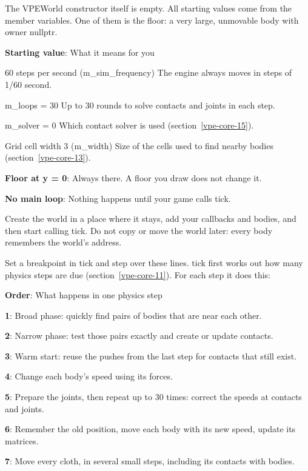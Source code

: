 \documentclass[11pt,a4paper]{article}
\begin{document}
The VPEWorld constructor itself is empty. All starting values come from the member variables. One of them is the floor: a very large, unmovable body with owner nullptr.

\textbf{Starting value}: What it means for you

60 steps per second (m\_sim\_frequency)                        The engine always moves in steps of 1/60 second.

m\_loops = 30                                                 Up to 30 rounds to solve contacts and joints in each step.

m\_solver = 0                                                 Which contact solver is used (section~\ref{vpe-core-15}).

Grid cell width 3 (m\_width)                                  Size of the cells used to find nearby bodies (section~\ref{vpe-core-13}).

\textbf{Floor at y = 0}: Always there. A floor you draw does not change it.

\textbf{No main loop}: Nothing happens until your game calls tick.

Create the world in a place where it stays, add your callbacks and bodies, and then start calling tick. Do not copy or move the world later: every body remembers the world's address.

\label{vpe-core-10}
Set a breakpoint in tick and step over these lines. tick first works out how many physics steps are due (section~\ref{vpe-core-11}). For each step it does this:

\textbf{Order}: What happens in one physics step

\textbf{1}: Broad phase: quickly find pairs of bodies that are near each other.

\textbf{2}: Narrow phase: test those pairs exactly and create or update contacts.

\textbf{3}: Warm start: reuse the pushes from the last step for contacts that still exist.

\textbf{4}: Change each body's speed using its forces.

\textbf{5}: Prepare the joints, then repeat up to 30 times: correct the speeds at contacts and joints.

\textbf{6}: Remember the old position, move each body with its new speed, update its matrices.

\textbf{7}: Move every cloth, in several small steps, including its contacts with bodies.
\end{document}
